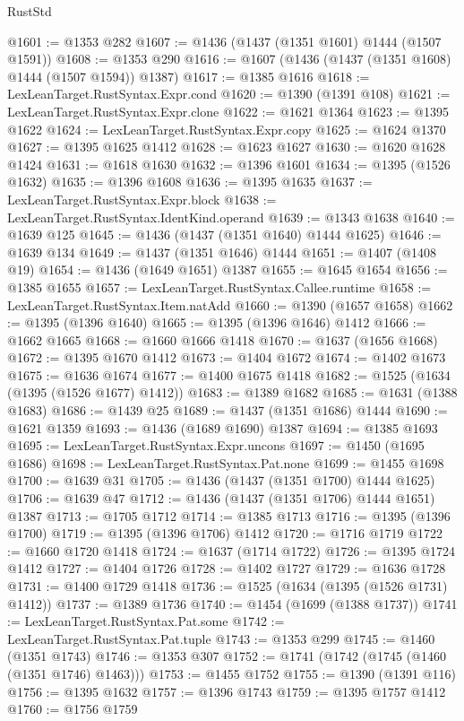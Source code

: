\begin{lexlean}{RustStd}
\begin{coremodule}
@1601 := @1353 @282
@1607 := @1436 (@1437 (@1351 @1601) @1444 (@1507 @1591))
@1608 := @1353 @290
@1616 := @1607 (@1436 (@1437 (@1351 @1608) @1444 (@1507 @1594)) @1387)
@1617 := @1385 @1616
@1618 := LexLeanTarget.RustSyntax.Expr.cond
@1620 := @1390 (@1391 @108)
@1621 := LexLeanTarget.RustSyntax.Expr.clone
@1622 := @1621 @1364
@1623 := @1395 @1622
@1624 := LexLeanTarget.RustSyntax.Expr.copy
@1625 := @1624 @1370
@1627 := @1395 @1625 @1412
@1628 := @1623 @1627
@1630 := @1620 @1628 @1424
@1631 := @1618 @1630
@1632 := @1396 @1601
@1634 := @1395 (@1526 @1632)
@1635 := @1396 @1608
@1636 := @1395 @1635
@1637 := LexLeanTarget.RustSyntax.Expr.block
@1638 := LexLeanTarget.RustSyntax.IdentKind.operand
@1639 := @1343 @1638
@1640 := @1639 @125
@1645 := @1436 (@1437 (@1351 @1640) @1444 @1625)
@1646 := @1639 @134
@1649 := @1437 (@1351 @1646) @1444
@1651 := @1407 (@1408 @19)
@1654 := @1436 (@1649 @1651) @1387
@1655 := @1645 @1654
@1656 := @1385 @1655
@1657 := LexLeanTarget.RustSyntax.Callee.runtime
@1658 := LexLeanTarget.RustSyntax.Item.natAdd
@1660 := @1390 (@1657 @1658)
@1662 := @1395 (@1396 @1640)
@1665 := @1395 (@1396 @1646) @1412
@1666 := @1662 @1665
@1668 := @1660 @1666 @1418
@1670 := @1637 (@1656 @1668)
@1672 := @1395 @1670 @1412
@1673 := @1404 @1672
@1674 := @1402 @1673
@1675 := @1636 @1674
@1677 := @1400 @1675 @1418
@1682 := @1525 (@1634 (@1395 (@1526 @1677) @1412))
@1683 := @1389 @1682
@1685 := @1631 (@1388 @1683)
@1686 := @1439 @25
@1689 := @1437 (@1351 @1686) @1444
@1690 := @1621 @1359
@1693 := @1436 (@1689 @1690) @1387
@1694 := @1385 @1693
@1695 := LexLeanTarget.RustSyntax.Expr.uncons
@1697 := @1450 (@1695 @1686)
@1698 := LexLeanTarget.RustSyntax.Pat.none
@1699 := @1455 @1698
@1700 := @1639 @31
@1705 := @1436 (@1437 (@1351 @1700) @1444 @1625)
@1706 := @1639 @47
@1712 := @1436 (@1437 (@1351 @1706) @1444 @1651) @1387
@1713 := @1705 @1712
@1714 := @1385 @1713
@1716 := @1395 (@1396 @1700)
@1719 := @1395 (@1396 @1706) @1412
@1720 := @1716 @1719
@1722 := @1660 @1720 @1418
@1724 := @1637 (@1714 @1722)
@1726 := @1395 @1724 @1412
@1727 := @1404 @1726
@1728 := @1402 @1727
@1729 := @1636 @1728
@1731 := @1400 @1729 @1418
@1736 := @1525 (@1634 (@1395 (@1526 @1731) @1412))
@1737 := @1389 @1736
@1740 := @1454 (@1699 (@1388 @1737))
@1741 := LexLeanTarget.RustSyntax.Pat.some
@1742 := LexLeanTarget.RustSyntax.Pat.tuple
@1743 := @1353 @299
@1745 := @1460 (@1351 @1743)
@1746 := @1353 @307
@1752 := @1741 (@1742 (@1745 (@1460 (@1351 @1746) @1463)))
@1753 := @1455 @1752
@1755 := @1390 (@1391 @116)
@1756 := @1395 @1632
@1757 := @1396 @1743
@1759 := @1395 @1757 @1412
@1760 := @1756 @1759

\end{coremodule}
\end{lexlean}
